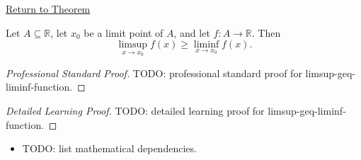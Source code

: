 \newpage
{}
\label{prf:limsup-geq-liminf-function}

\begin{remark*}[Return]
\hyperref[prop:limsup-geq-liminf-function]{Return to Theorem}
\end{remark*}

\begin{proposition*}[$$]
Let $A\subseteq \mathbb{R}$, let $x_0$ be a limit point of $A$, and let $f:A\to\mathbb{R}$. Then
\[
\limsup_{x\to x_0} f(x) \ge \liminf_{x\to x_0} f(x).
\]
\end{proposition*}

\begin{proof}[Professional Standard Proof]
\LRAProofBodyStart
TODO: professional standard proof for limsup-geq-liminf-function.
\end{proof}

\begin{proof}[Detailed Learning Proof]
\LRAProofBodyStart
TODO: detailed learning proof for limsup-geq-liminf-function.
\end{proof}

\begin{remark*}
\end{remark*}

\begin{dependencies}
\begin{itemize}
  \item TODO: list mathematical dependencies.
\end{itemize}
\end{dependencies}

\clearpage
